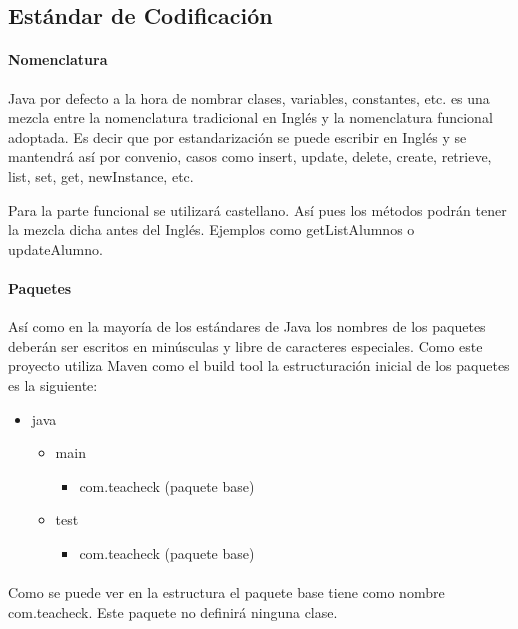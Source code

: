 \subsection{Estándar de Codificación}
\paragraph{Nomenclatura}
Java por defecto a la hora de nombrar clases, variables, constantes, etc. es una mezcla entre la nomenclatura tradicional en Inglés y la nomenclatura funcional adoptada. Es decir que por estandarización se puede escribir en Inglés y se mantendrá así por convenio, casos como insert, update, delete, create, retrieve, list, set, get, newInstance, etc.

Para la parte funcional se utilizará castellano. Así pues los métodos podrán tener la mezcla dicha antes del Inglés. Ejemplos como getListAlumnos o updateAlumno.
\paragraph{Paquetes}
Así como en la mayoría de los estándares de Java los nombres de los paquetes deberán ser escritos en minúsculas y libre de caracteres especiales. Como este proyecto utiliza Maven como el build tool la estructuración inicial de los paquetes es la siguiente:

\begin{itemize}
\item
  java
  \begin{itemize}
  \item
    main
    \begin{itemize}      
    \item
      com.teacheck (paquete base)
    \end{itemize}
  \item
   test
   \begin{itemize}     
   \item     
     com.teacheck (paquete base)     
   \end{itemize}
  \end{itemize}
\end{itemize}

\paragraph{}
Como se puede ver en la estructura el paquete base tiene como nombre com.teacheck. Este paquete no definirá ninguna clase. 

